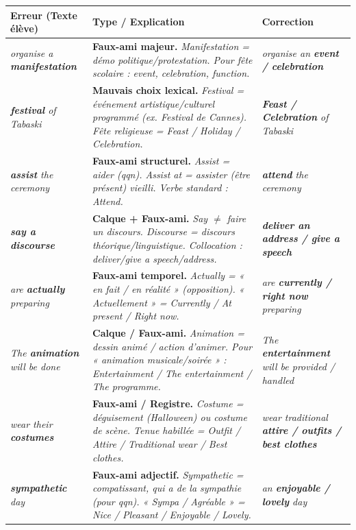 \documentclass[11pt]{article}
\newcommand{\eng}[1]{\ifmmode\text{\textit{#1}}\else\begingroup\selectlanguage{english}\itshape #1\endgroup\fi}
\begin{document}
\begin{exoresolu}
\begin{center}
\begin{tabularx}{\linewidth}{|X|X|X|}
\hline
\rowcolor{poporangeL} \textbf{Erreur (Texte élève)} & \textbf{Type / Explication} & \textbf{Correction} \\ \hline
\eng{organise a \textbf{manifestation}} & \textbf{Faux-ami majeur.} \eng{Manifestation} = démo politique/protestation. Pour fête scolaire : \eng{event, celebration, function}. & \eng{organise an \textbf{event / celebration}} \\ \hline
\eng{\textbf{festival} of Tabaski} & \textbf{Mauvais choix lexical.} \eng{Festival} = événement artistique/culturel programmé (ex. Festival de Cannes). Fête religieuse = \eng{Feast / Holiday / Celebration}. & \eng{\textbf{Feast / Celebration} of Tabaski} \\ \hline
\eng{\textbf{assist} the ceremony} & \textbf{Faux-ami structurel.} \eng{Assist} = aider (qqn). \eng{Assist at} = assister (être présent) vieilli. Verbe standard : \eng{Attend}. & \eng{\textbf{attend} the ceremony} \\ \hline
\eng{\textbf{say a discourse}} & \textbf{Calque + Faux-ami.} \eng{Say} $\neq$ faire un discours. \eng{Discourse} = discours théorique/linguistique. Collocation : \eng{deliver/give a speech/address}. & \eng{\textbf{deliver an address / give a speech}} \\ \hline
\eng{are \textbf{actually} preparing} & \textbf{Faux-ami temporel.} \eng{Actually} = « en fait / en réalité » (opposition). « Actuellement » = \eng{Currently / At present / Right now}. & \eng{are \textbf{currently / right now} preparing} \\ \hline
\eng{The \textbf{animation} will be done} & \textbf{Calque / Faux-ami.} \eng{Animation} = dessin animé / action d'animer. Pour « animation musicale/soirée » : \eng{Entertainment / The entertainment / The programme}. & \eng{The \textbf{entertainment} will be provided / handled} \\ \hline
\eng{wear their \textbf{costumes}} & \textbf{Faux-ami / Registre.} \eng{Costume} = déguisement (Halloween) ou costume de scène. Tenue habillée = \eng{Outfit / Attire / Traditional wear / Best clothes}. & \eng{wear traditional \textbf{attire / outfits / best clothes}} \\ \hline
\eng{\textbf{sympathetic} day} & \textbf{Faux-ami adjectif.} \eng{Sympathetic} = compatissant, qui a de la sympathie (pour qqn). « Sympa / Agréable » = \eng{Nice / Pleasant / Enjoyable / Lovely}. & \eng{an \textbf{enjoyable / lovely} day} \\ \hline
\end{tabularx}
\end{center}


\end{exoresolu}
\end{document}
